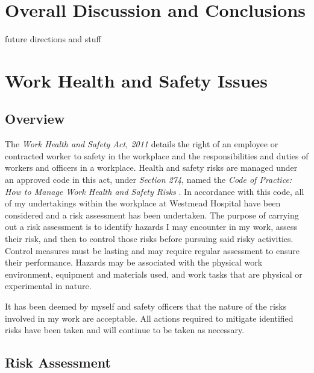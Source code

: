 \documentclass[12pt, openany, oneside]{book}
\begin{document}
	













\chapter{Overall Discussion and Conclusions}
future directions and stuff






\chapter{Work Health and Safety Issues}

\section{Overview}
The \textit{Work Health and Safety Act, 2011} \cite{whs2011} details the right of an employee or contracted worker to safety in the workplace and the responsibilities and duties of workers and officers in a workplace. Health and safety risks are managed under an approved code in this act, under \textit{Section 274}, named the \textit{Code of Practice: How to Manage Work Health and Safety Risks} \cite{whs2011}.
In accordance with this code, all of my undertakings within the workplace at Westmead Hospital have been considered and a risk assessment has been undertaken. The purpose of carrying out a risk assessment is to identify hazards I may encounter in my work, assess their risk, and then to control those risks before pursuing said risky activities. Control measures must be lasting and may require regular assessment to ensure their performance. Hazards may be associated with the physical work environment, equipment and materials used, and work tasks that are physical or experimental in nature.

It has been deemed by myself and safety officers that the nature of the risks involved in my work are acceptable. All actions required to mitigate identified risks have been taken and will continue to be taken as necessary.
\section{Risk Assessment}
\end{document}
